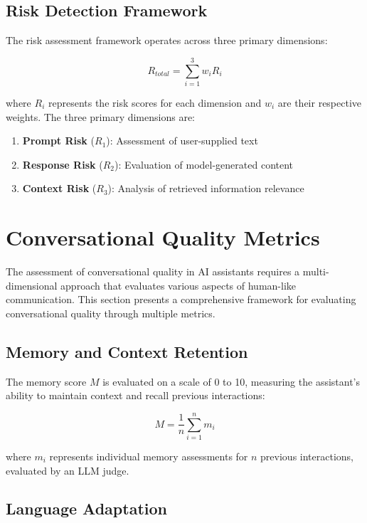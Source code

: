 \documentclass[12pt]{article}
\begin{document}
\subsection{Risk Detection Framework}

The risk assessment framework operates across three primary dimensions:

\begin{equation}
    R_{total} = \sum_{i=1}^{3} w_i R_i
\end{equation}

where $R_i$ represents the risk scores for each dimension and $w_i$ are their respective weights. The three primary dimensions are:

\begin{enumerate}
    \item \textbf{Prompt Risk} ($R_1$): Assessment of user-supplied text
    \item \textbf{Response Risk} ($R_2$): Evaluation of model-generated content
    \item \textbf{Context Risk} ($R_3$): Analysis of retrieved information relevance
\end{enumerate}

\section{Conversational Quality Metrics}

The assessment of conversational quality in AI assistants requires a multi-dimensional approach that evaluates various aspects of human-like communication. This section presents a comprehensive framework for evaluating conversational quality through multiple metrics.

\subsection{Memory and Context Retention}

The memory score $M$ is evaluated on a scale of 0 to 10, measuring the assistant's ability to maintain context and recall previous interactions:

\begin{equation}
    M = \frac{1}{n}\sum_{i=1}^{n} m_i
\end{equation}

where $m_i$ represents individual memory assessments for $n$ previous interactions, evaluated by an LLM judge.

\subsection{Language Adaptation}
\end{document}
